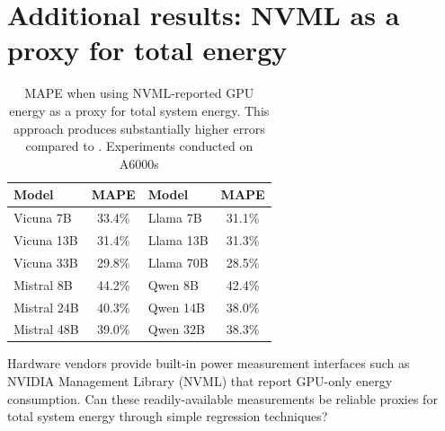 \section{Additional results: NVML as a proxy for total energy}
\label{app:nvml_proxy}
\begin{table}[t]
\centering
\small
\setlength{\tabcolsep}{3pt}
\renewcommand{\arraystretch}{1.05}

\begin{tabular}{
  @{}
  l
  c
  l
  c
  @{}
}
\toprule
\textbf{Model} & \textbf{MAPE} & \textbf{Model} & \textbf{MAPE} \\
\midrule
\rowcolor{rowblue} Vicuna 7B   & 33.4\% & Llama 7B   & 31.1\% \\
Vicuna 13B                     & 31.4\% & Llama 13B  & 31.3\% \\
\rowcolor{rowblue} Vicuna 33B  & 29.8\% & Llama 70B  & 28.5\% \\
\midrule
Mistral 8B                     & 44.2\% & Qwen 8B    & 42.4\% \\
\rowcolor{rowblue} Mistral 24B & 40.3\% & Qwen 14B   & 38.0\% \\
Mistral 48B                    & 39.0\% & Qwen 32B   & 38.3\% \\
\bottomrule
\end{tabular}

\caption{MAPE when using NVML-reported GPU energy as a proxy for total system energy. This approach produces substantially higher errors compared to \sys{}. Experiments conducted on A6000s}
\label{tab:nvml_proxy}
\end{table}

Hardware vendors provide built-in power measurement interfaces such as NVIDIA Management Library (NVML) that report GPU-only energy consumption. Can these readily-available measurements be reliable proxies for total system energy through simple regression techniques? %


